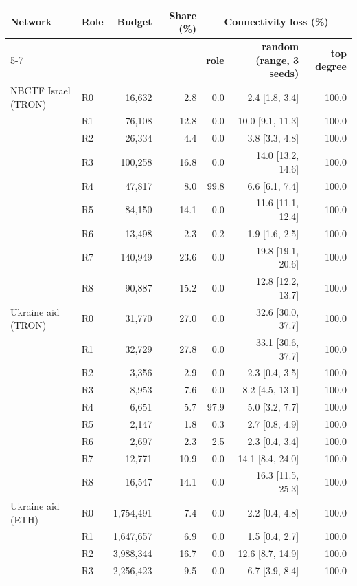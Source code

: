 \begin{tabular}{llrrrrr}
\toprule
\textbf{Network} & \textbf{Role} & \textbf{Budget} & \textbf{Share (\%)} & \multicolumn{3}{c}{\textbf{Connectivity loss (\%)}} \\
\cmidrule(lr){5-7}
 & & & & \textbf{role} & \textbf{random (range, 3 seeds)} & \textbf{top degree} \\
\midrule
NBCTF Israel (TRON) & R0 & 16,632 & 2.8 & 0.0 & 2.4 [1.8, 3.4] & 100.0 \\
 & R1 & 76,108 & 12.8 & 0.0 & 10.0 [9.1, 11.3] & 100.0 \\
 & R2 & 26,334 & 4.4 & 0.0 & 3.8 [3.3, 4.8] & 100.0 \\
 & R3 & 100,258 & 16.8 & 0.0 & 14.0 [13.2, 14.6] & 100.0 \\
 & R4 & 47,817 & 8.0 & 99.8 & 6.6 [6.1, 7.4] & 100.0 \\
 & R5 & 84,150 & 14.1 & 0.0 & 11.6 [11.1, 12.4] & 100.0 \\
 & R6 & 13,498 & 2.3 & 0.2 & 1.9 [1.6, 2.5] & 100.0 \\
 & R7 & 140,949 & 23.6 & 0.0 & 19.8 [19.1, 20.6] & 100.0 \\
 & R8 & 90,887 & 15.2 & 0.0 & 12.8 [12.2, 13.7] & 100.0 \\
\addlinespace
Ukraine aid (TRON) & R0 & 31,770 & 27.0 & 0.0 & 32.6 [30.0, 37.7] & 100.0 \\
 & R1 & 32,729 & 27.8 & 0.0 & 33.1 [30.6, 37.7] & 100.0 \\
 & R2 & 3,356 & 2.9 & 0.0 & 2.3 [0.4, 3.5] & 100.0 \\
 & R3 & 8,953 & 7.6 & 0.0 & 8.2 [4.5, 13.1] & 100.0 \\
 & R4 & 6,651 & 5.7 & 97.9 & 5.0 [3.2, 7.7] & 100.0 \\
 & R5 & 2,147 & 1.8 & 0.3 & 2.7 [0.8, 4.9] & 100.0 \\
 & R6 & 2,697 & 2.3 & 2.5 & 2.3 [0.4, 3.4] & 100.0 \\
 & R7 & 12,771 & 10.9 & 0.0 & 14.1 [8.4, 24.0] & 100.0 \\
 & R8 & 16,547 & 14.1 & 0.0 & 16.3 [11.5, 25.3] & 100.0 \\
\addlinespace
Ukraine aid (ETH) & R0 & 1,754,491 & 7.4 & 0.0 & 2.2 [0.4, 4.8] & 100.0 \\
 & R1 & 1,647,657 & 6.9 & 0.0 & 1.5 [0.4, 2.7] & 100.0 \\
 & R2 & 3,988,344 & 16.7 & 0.0 & 12.6 [8.7, 14.9] & 100.0 \\
 & R3 & 2,256,423 & 9.5 & 0.0 & 6.7 [3.9, 8.4] & 100.0 \\

\end{tabular}
